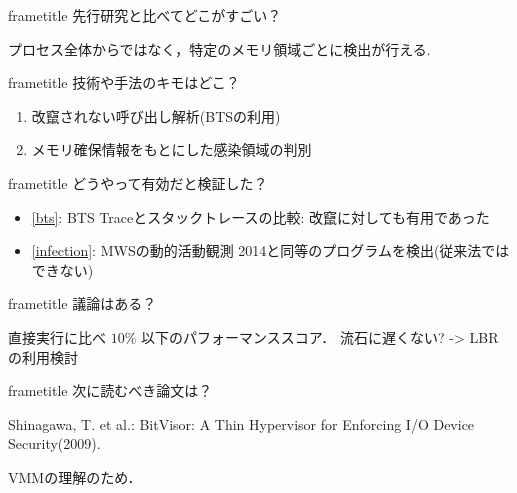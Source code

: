 \begin{frame}[plain,t]
\begin{multicols}{2}
    \vfill
    \begin{beamercolorbox}[rounded=true, center, shadow=true,wd=\linewidth]{frametitle}
      先行研究と比べてどこがすごい？
    \end{beamercolorbox}
    プロセス全体からではなく，特定のメモリ領域ごとに検出が行える.

    \vfill
    \begin{beamercolorbox}[rounded=true, center, shadow=true,wd=\linewidth]{frametitle}
      技術や手法のキモはどこ？
    \end{beamercolorbox}
    \begin{enumerate}
      \item 改竄されない呼び出し解析(BTSの利用) \label{bts}
      \item メモリ確保情報をもとにした感染領域の判別 \label{infection}
    \end{enumerate}

    \newpage
    \begin{beamercolorbox}[rounded=true, center, shadow=true,wd=\linewidth]{frametitle}
      どうやって有効だと検証した？
    \end{beamercolorbox}
    \begin{itemize}
      \item \ref{bts}: BTS Traceとスタックトレースの比較: 改竄に対しても有用であった
      \item \ref{infection}: MWSの動的活動観測 2014と同等のプログラムを検出(従来法ではできない)
    \end{itemize}

    \vfill
    \begin{beamercolorbox}[rounded=true, center, shadow=true,wd=\linewidth]{frametitle}
      議論はある？
    \end{beamercolorbox}
    直接実行に比べ $10\%$ 以下のパフォーマンススコア． 流石に遅くない? -> LBRの利用検討

    \vfill
    \begin{beamercolorbox}[rounded=true, center, shadow=true,wd=\linewidth]{frametitle}
      次に読むべき論文は？
    \end{beamercolorbox}
    Shinagawa, T. et al.: BitVisor: A Thin Hypervisor for Enforcing I/O Device Security(2009).

    VMMの理解のため．

  \end{multicols}
\end{frame}
